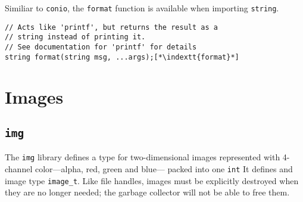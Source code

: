 \documentclass[11pt]{article}
\makeatletter
\newcommand{\indextt}[1]{\index{#1@\texttt{#1}}}
\makeatother
\begin{document}
Similiar to \lstinline'conio', the \lstinline'format' function 
is available when importing \lstinline'string'. 
\begin{lstlisting}
// Acts like 'printf', but returns the result as a 
// string instead of printing it.
// See documentation for 'printf' for details
string format(string msg, ...args);[*\indextt{format}*]
\end{lstlisting}

\clearpage

\section{Images}

\subsection{\tt img}

The \lstinline'img' library defines a type for two-dimensional images
represented with 4-channel color---alpha, red, green and blue---
packed into one \lstinline'int'  It defines and image type \lstinline'image_t'.
Like file handles, images must be explicitly destroyed when they
are no longer needed; the garbage collector will not be able to
free them.
\end{document}
